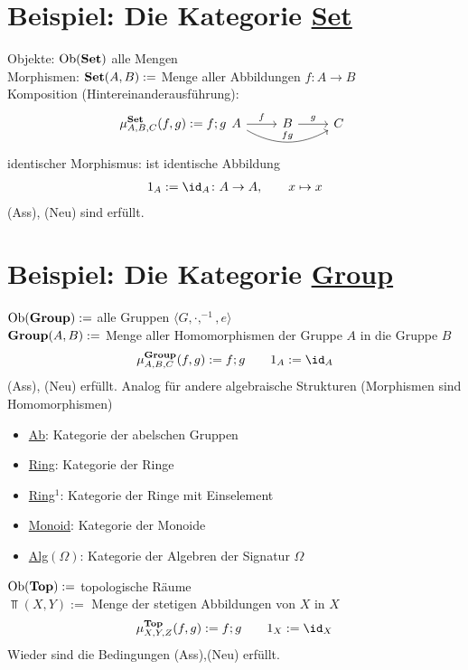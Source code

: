 \section{Beispiel: Die Kategorie \texorpdfstring{\ul{Set}}{Set}}\label{section:1.3}
Objekte: $\operatorname{Ob}(\operatorname{\mathbf{Set}})$ alle Mengen\\
Morphismen: $\operatorname{\mathbf{Set}}(A,B):=$ Menge aller Abbildungen $f\colon A\to B$\\
Komposition (Hintereinanderausführung):
$$
	\mu_{A,B,C}^{\Set}(f,g):=f;g\\
	\begin{tikzcd}[ampersand replacement=\&]
		A \arrow{r}{f} \arrow[bend right]{rr}{fg} \& B \arrow{r}{g} \& C
  	\end{tikzcd}
$$
identischer Morphismus: ist identische Abbildung
\begin{align*}
	1_A:=\id_A\colon A\to A,\qquad x\mapsto x
\end{align*}
(Ass), (Neu) sind erfüllt.

\section{Beispiel: Die Kategorie \texorpdfstring{\ul{Group}}{Group}}
$\operatorname{Ob}(\operatorname{\mathbf{Group}}):=$ alle Gruppen $\langle G,\cdot,^{-1},e\rangle$\\
$\operatorname{\mathbf{Group}}(A,B):=$ Menge aller Homomorphismen der Gruppe $A$ in die Gruppe $B$
\begin{align*}
	\mu_{A,B,C}^{\Group}(f,g):=f;g\qquad 1_A:=\id_A
\end{align*}
(Ass), (Neu) erfüllt.\nl
Analog für andere algebraische Strukturen (Morphismen sind Homomorphismen)
\begin{itemize}
	\item \ul{Ab}: Kategorie der abelschen Gruppen
	\item \ul{Ring}: Kategorie der Ringe
	\item \ul{Ring$^1$}: Kategorie der Ringe mit Einselement
	\item \ul{Monoid}: Kategorie der Monoide
	\item \ul{Alg$(\Omega)$}: Kategorie der Algebren der Signatur $\Omega$
\end{itemize}

\setcounter{satz}{4}

\begin{beispiel}[\ul{Top}]\label{beisp1.5Top}\enter
	$\operatorname{Ob}(\operatorname{\mathbf{Top}}):=$ topologische Räume\\
	$\Top(X,Y):=$ Menge der stetigen Abbildungen von $X$ in $X$
	\begin{align*}
		\mu_{X,Y,Z}^{\Top}(f,g):=f;g\qquad
		1_X:=\id_X
	\end{align*}
	Wieder sind die Bedingungen (Ass),(Neu) erfüllt.
\end{beispiel}


